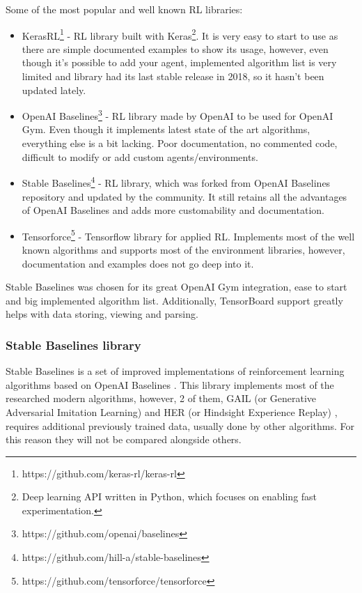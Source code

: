 \documentclass[12pt, a4paper]{article}
\begin{document}
Some of the most popular and well known RL libraries:
\begin{itemize}
  \item KerasRL\footnote{https://github.com/keras-rl/keras-rl} \cite{plappert2016kerasrl} - RL library built with Keras\footnote{Deep learning API written in Python, which focuses on enabling fast experimentation.}. It is very easy to start to use as there are simple documented examples to show its usage, however, even though it's possible to add your agent, implemented algorithm list is very limited and library had its last stable release in 2018, so it hasn't been updated lately.
  \item OpenAI Baselines\footnote{https://github.com/openai/baselines} \cite{baselines} - RL library made by OpenAI to be used for OpenAI Gym. Even though it implements latest state of the art algorithms, everything else is a bit lacking. Poor documentation, no commented code, difficult to modify or add custom agents/environments.
  \item Stable Baselines\footnote{https://github.com/hill-a/stable-baselines} \cite{stable-baselines} - RL library, which was forked from OpenAI Baselines repository and updated by the community. It still retains all the advantages of OpenAI Baselines and adds more customability and documentation.
  \item Tensorforce\footnote{https://github.com/tensorforce/tensorforce} \cite{tensorforce} - Tensorflow library for applied RL. Implements most of the well known algorithms and supports most of the environment libraries, however, documentation and examples does not go deep into it.
\end{itemize}

Stable Baselines was chosen for its great OpenAI Gym integration, ease to start and big implemented algorithm list. Additionally, TensorBoard support greatly helps with data storing, viewing and parsing.

\subsubsection{Stable Baselines library}

Stable Baselines \cite{stable-baselines} is a set of improved implementations of reinforcement learning algorithms based on OpenAI Baselines \cite{baselines}. This library implements most of the researched modern algorithms, however, 2 of them, GAIL (or Generative Adversarial Imitation Learning) \cite{ho:2016} and HER (or Hindsight Experience Replay) \cite{andrychowicz:2017}, requires additional previously trained data, usually done by other algorithms. For this reason they will not be compared alongside others.
\end{document}
